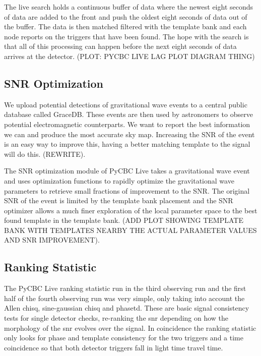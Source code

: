 The live search holds a continuous buffer of data where the newest eight seconds of data are added to the front and push the oldest eight seconds of data out of the buffer. The data is then matched filtered with the template bank and each node reports on the triggers that have been found. The hope with the search is that all of this processing can happen before the next eight seconds of data arrives at the detector. (PLOT: PYCBC LIVE LAG PLOT DIAGRAM THING)

\subsection{\label{2:sec:snr-optimization}SNR Optimization}

We upload potential detections of gravitational wave events to a central public database called GraceDB. These events are then used by astronomers to observe potential electromagnetic counterparts. We want to report the best information we can and produce the most accurate sky map. Increasing the SNR of the event is an easy way to improve this, having a better matching template to the signal will do this. (REWRITE).

The SNR optimization module of PyCBC Live takes a gravitational wave event and uses optimization functions to rapidly optimize the gravitational wave parameters to retrieve small fractions of improvement to the SNR. The original SNR of the event is limited by the template bank placement and the SNR optimizer allows a much finer exploration of the local parameter space to the best found template in the template bank. (ADD PLOT SHOWING TEMPLATE BANK WITH TEMPLATES NEARBY THE ACTUAL PARAMETER VALUES AND SNR IMPROVEMENT).

\subsection{\label{2:sec:live-ranking-statistic}Ranking Statistic}

The PyCBC Live ranking statistic run in the third observing run and the first half of the fourth observing run was very simple, only taking into account the Allen chisq, sine-gaussian chisq and phasetd. These are basic signal consistency tests for single detector checks, re-ranking the snr depending on how the morphology of the snr evolves over the signal. In coincidence the ranking statistic only looks for phase and template consistency for the two triggers and a time coincidence so that both detector triggers fall in light time travel time.



